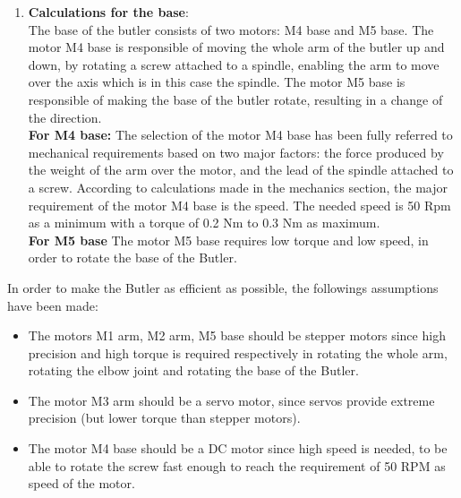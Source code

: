 \begin{enumerate}
\begin{itemize}
\end{itemize}

\item \textbf{Calculations for the base}:\\
The base of the butler consists of two motors: M4 base and M5 base. The motor M4 base is responsible of moving the whole arm of the butler up and down, by rotating a screw attached to a spindle, enabling the arm to move over the axis which is in this case the spindle. The motor M5 base is responsible of making the base of the butler rotate, resulting in a change of the direction.\\

\textbf{For M4 base:}
The selection of the motor M4 base has been fully referred to mechanical requirements based on two major factors: the force produced by the weight of the arm over the motor, and the lead of the spindle attached to a screw. According to calculations made in the mechanics section, the major requirement of the motor M4 base is the speed. The needed speed is 50 Rpm as a minimum with a torque of 0.2 Nm to 0.3 Nm as maximum.
\\

\textbf{For M5 base}
The motor M5 base requires low torque and low speed, in order to rotate the base of the Butler.

\end{enumerate}
In order to make the Butler as efficient as possible, the followings assumptions have been made:
\begin{itemize}
    \item The motors M1 arm, M2 arm, M5 base should be stepper motors since high precision and high torque is required respectively in rotating the whole arm, rotating the elbow joint and rotating the base of the Butler.
    \item The motor M3 arm should be a servo motor, since servos provide extreme precision (but lower torque than stepper motors).
    \item The motor M4 base should be a DC motor since high speed is needed, to be able to rotate the screw fast enough to reach the requirement of 50 RPM as speed of the motor.
\end{itemize}






